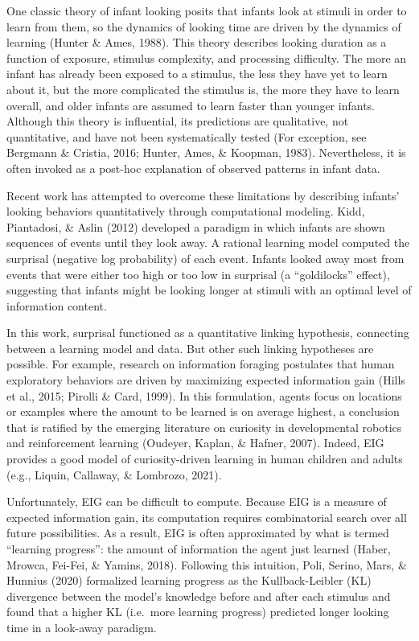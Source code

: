 \documentclass[10pt, letterpaper]{article}
\begin{document}
One classic theory of infant looking posits that infants look at stimuli
in order to learn from them, so the dynamics of looking time are driven
by the dynamics of learning (Hunter \& Ames, 1988). This theory
describes looking duration as a function of exposure, stimulus
complexity, and processing difficulty. The more an infant has already
been exposed to a stimulus, the less they have yet to learn about it,
but the more complicated the stimulus is, the more they have to learn
overall, and older infants are assumed to learn faster than younger
infants. Although this theory is influential, its predictions are
qualitative, not quantitative, and have not been systematically tested
(For exception, see Bergmann \& Cristia, 2016; Hunter, Ames, \& Koopman,
1983). Nevertheless, it is often invoked as a post-hoc explanation of
observed patterns in infant data.

Recent work has attempted to overcome these limitations by describing
infants' looking behaviors quantitatively through computational
modeling. Kidd, Piantadosi, \& Aslin (2012) developed a paradigm in
which infants are shown sequences of events until they look away. A
rational learning model computed the surprisal (negative log
probability) of each event. Infants looked away most from events that
were either too high or too low in surprisal (a ``goldilocks'' effect),
suggesting that infants might be looking longer at stimuli with an
optimal level of information content.

In this work, surprisal functioned as a quantitative linking hypothesis,
connecting between a learning model and data. But other such linking
hypotheses are possible. For example, research on information foraging
postulates that human exploratory behaviors are driven by maximizing
expected information gain (Hills et al., 2015; Pirolli \& Card, 1999).
In this formulation, agents focus on locations or examples where the
amount to be learned is on average highest, a conclusion that is
ratified by the emerging literature on curiosity in developmental
robotics and reinforcement learning (Oudeyer, Kaplan, \& Hafner, 2007).
Indeed, EIG provides a good model of curiosity-driven learning in human
children and adults (e.g., Liquin, Callaway, \& Lombrozo, 2021).

Unfortunately, EIG can be difficult to compute. Because EIG is a measure
of expected information gain, its computation requires combinatorial
search over all future possibilities. As a result, EIG is often
approximated by what is termed ``learning progress'': the amount of
information the agent just learned (Haber, Mrowca, Fei-Fei, \& Yamins,
2018). Following this intuition, Poli, Serino, Mars, \& Hunnius (2020)
formalized learning progress as the Kullback-Leibler (KL) divergence
between the model's knowledge before and after each stimulus and found
that a higher KL (i.e.~more learning progress) predicted longer looking
time in a look-away paradigm.
\end{document}
